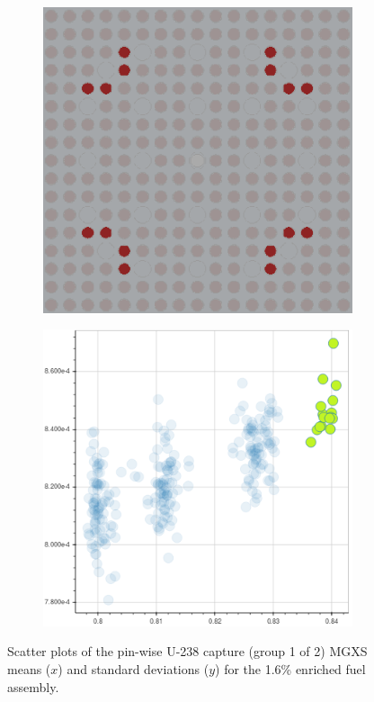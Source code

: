 \begin{figure}[h!]
\begin{subfigure}{0.42\textwidth}
  \caption{}
  \label{fig:chap10-capt-mean-std-mgxs-2}
\end{subfigure}
\begin{subfigure}{0.42\textwidth}
  \centering
  \includegraphics[width=0.9\linewidth]{figures/unsupervised/features/assm-16/u238-capt/mean-std/geometry-3}
  \caption{}
  \label{fig:chap10-capt-mean-std-geom-3}
\end{subfigure}%
\begin{subfigure}{0.42\textwidth}
  \centering
  \includegraphics[width=0.9\linewidth]{figures/unsupervised/features/assm-16/u238-capt/mean-std/mgxs-3}
  \caption{}
  \label{fig:chap10-capt-mean-std-mgxs-3}
\end{subfigure}
\caption[Clustering of U-238 capture MGXS standard deviations]{Scatter plots of the pin-wise U-238 capture (group 1 of 2) \ac{MGXS} means ($x$) and standard deviations ($y$) for the 1.6\% enriched fuel assembly.}
\label{fig:chap10-mean-std}
\end{figure}

